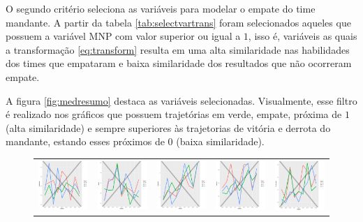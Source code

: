 \documentclass[doc,apacite,oneside,a4paper,12pt]{apa6}
\begin{document}
O segundo critério seleciona as variáveis para modelar o empate do time mandante. A partir da tabela \ref{tab:selectvartrans} foram selecionados aqueles que possuem a variável MNP com valor superior ou igual a $1$, isso é, variáveis as quais a transformação \ref{eq:transform} resulta em uma alta similaridade nas habilidades dos times que empataram e baixa similaridade dos resultados que não ocorreram empate.



A figura \ref{fig:medresumo} destaca as variáveis selecionadas. Visualmente, esse filtro é realizado nos gráficos que possuem trajetórias em verde, empate, próxima de $1$ (alta similaridade) e sempre superiores às trajetorias de vitória e derrota do mandante, estando esses próximos de $0$ (baixa similaridade).

\begin{figure}
\begin{tabular}{ccccc}
  \includegraphics[width=25mm]{aceleracao_result_trans} & \includegraphics[width=25mm]{altura_result_trans} & \includegraphics[width=25mm]{cabeceio_result_trans} &   \includegraphics[width=25mm]{carrinho_result_trans} &
  \includegraphics[width=25mm]{ch_delonge_result_trans} \\

\end{tabular}
\end{figure}
\end{document}
